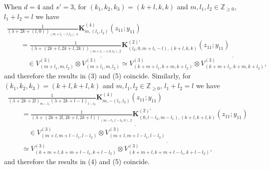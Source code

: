 \documentclass[pdftex]{sigma}
\numberwithin{equation}{section}
\newcommand{\bK}{\mathbf{K}}
\newcommand{\BZ}{\mathbb{Z}}
\begin{document}
When $d=4$ and $s'=3$, for $(k_1,k_2,k_3)=(k+l,k,k)$ and $m,l_1,l_2\in\BZ_{\ge 0}$, $l_1+l_2=l$ we have
\begin{gather*}
 \frac{1}{(\lambda+2k+(l,0))_{(m+l_1-l,l_2),4}}\bK_{m,(l_1,l_2)}^{(4)}(z_{11};y_{11}) \\
\qquad{} =\frac{1}{(\lambda+(2k+l,2k+l,2k))_{(m+l_1-l,0,l_2),2}}\bK_{(l_2,0,m+l_1-l),(k+l,k,k)}^{(2)\prime}(z_{11};y_{11}) \\
\qquad\quad {} \in V_{(m+l_1,m,l_2)}^{(3)}\otimes \overline{V_{(m+l_1,m,l_2)}^{(3)}}
\simeq V_{(k+m+l_1,k+m,k+l_2)}^{(3)}\otimes \overline{V_{(k+m+l_1,k+m,k+l_2)}^{(3)}},
\end{gather*}
and therefore the results in (3) and (5) coincide. Similarly, for $(k_1,k_2,k_3)=(k+l,k+l,k)$ and $m,l_1,l_2\in\BZ_{\ge 0}$, $l_1+l_2=l$ we have
\begin{gather*}
 \frac{1}{(\lambda+2k+2l)_{m-l_1}(\lambda+2k+l-1)_{l-l_2}}\bK_{m,-(l_1,l_2)}^{(4)}(z_{11};y_{11}) \\
\qquad{} =\frac{1}{(\lambda+(2k+2l,2k+l,2k+l))_{(m-l_1,l-l_2,0),2}}\bK_{(0,l-l_2,m-l_1),(k+l,k+l,k)}^{(2)\prime}(z_{11};y_{11}) \\
\qquad\quad{} \in V_{(m+l,m+l-l_1,l-l_2)}^{(3)}\otimes \overline{V_{(m+l,m+l-l_1,l-l_2)}^{(3)}} \\
\qquad{} \simeq V_{(k+m+l,k+m+l-l_1,k+l-l_2)}^{(3)}\otimes \overline{V_{(k+m+l,k+m+l-l_1,k+l-l_2)}^{(3)}},
\end{gather*}
and therefore the results in (4) and (5) coincide.
\end{document}
